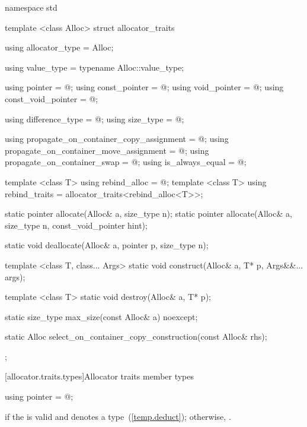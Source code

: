%
\begin{codeblock}
namespace std {
  template <class Alloc> struct allocator_traits {
    using allocator_type     = Alloc;

    using value_type         = typename Alloc::value_type;

    using pointer            = @\seebelow@;
    using const_pointer      = @\seebelow@;
    using void_pointer       = @\seebelow@;
    using const_void_pointer = @\seebelow@;

    using difference_type    = @\seebelow@;
    using size_type          = @\seebelow@;

    using propagate_on_container_copy_assignment = @\seebelow@;
    using propagate_on_container_move_assignment = @\seebelow@;
    using propagate_on_container_swap            = @\seebelow@;
    using is_always_equal                        = @\seebelow@;

    template <class T> using rebind_alloc = @\seebelow@;
    template <class T> using rebind_traits = allocator_traits<rebind_alloc<T>>;

    static pointer allocate(Alloc& a, size_type n);
    static pointer allocate(Alloc& a, size_type n, const_void_pointer hint);

    static void deallocate(Alloc& a, pointer p, size_type n);

    template <class T, class... Args>
      static void construct(Alloc& a, T* p, Args&&... args);

    template <class T>
      static void destroy(Alloc& a, T* p);

    static size_type max_size(const Alloc& a) noexcept;

    static Alloc select_on_container_copy_construction(const Alloc& rhs);
  };
}
\end{codeblock}

[allocator.traits.types]{Allocator traits member types}

%
\begin{itemdecl}
using pointer = @\seebelow@;
\end{itemdecl}

\begin{itemdescr}
\pnum
\ctype {} if
the   is valid and denotes a
type~(\ref{temp.deduct}); otherwise, .
\end{itemdescr}

